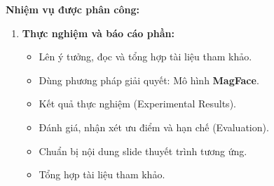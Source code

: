 \textbf{Nhiệm vụ được phân công:}
\begin{enumerate}
    \item \textbf{Thực nghiệm và báo cáo phần:}
    \begin{itemize}
        \item Lên ý tưởng, đọc và tổng hợp tài liệu tham khảo.
        \item Dùng phương pháp giải quyết: Mô hình \textbf{MagFace}.
        \item Kết quả thực nghiệm (Experimental Results).
        \item Đánh giá, nhận xét ưu điểm và hạn chế (Evaluation).
        \item Chuẩn bị nội dung slide thuyết trình tương ứng.
        \item Tổng hợp tài liệu tham khảo.
    \end{itemize}
\end{enumerate}
